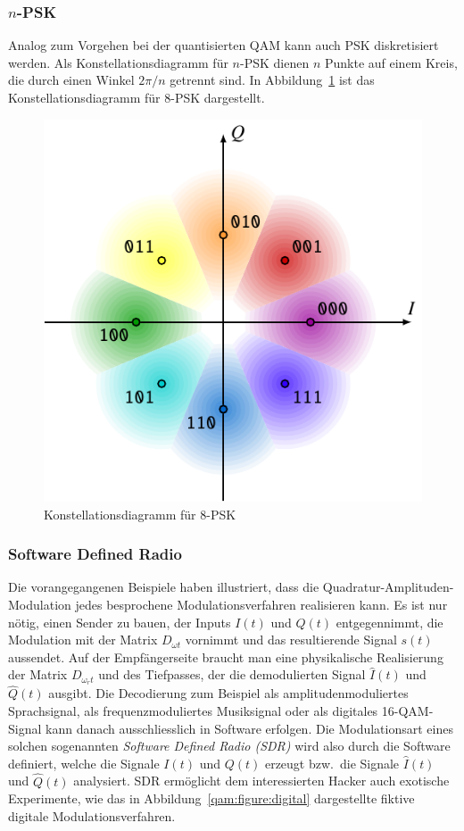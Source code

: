 \subsubsection{$n$-PSK}
Analog zum Vorgehen bei der quantisierten QAM kann auch PSK diskretisiert
werden.
Als Konstellationsdiagramm für $n$-PSK dienen $n$ Punkte auf einem Kreis,
die durch einen Winkel $2\pi/n$ getrennt sind.
In Abbildung~\ref{figure:qam:psk} ist das Konstellationsdiagramm für
$8$-PSK dargestellt.
\begin{figure}
\centering
\includegraphics{applications/qam/images/psk.pdf}
\caption{Konstellationsdiagramm für 8-PSK 
\label{figure:qam:psk}}
\end{figure}

\subsubsection{Software Defined Radio}
Die vorangegangenen Beispiele haben illustriert, dass die
Quadratur-Amplituden-Modulation jedes besprochene Modulationsverfahren
realisieren kann.
Es ist nur nötig, einen Sender zu bauen, der Inputs $I(t)$ und $Q(t)$
entgegennimmt, die Modulation mit der Matrix $D_{\omega t}$ vornimmt
und das resultierende Signal $s(t)$ aussendet.
Auf der Empfängerseite braucht man eine physikalische Realisierung
der Matrix $D_{\omega_r t}$ und des Tiefpasses, der die demodulierten
Signal $\hat{I}(t)$ und $\hat{Q}(t)$ ausgibt.
Die Decodierung zum Beispiel als amplitudenmoduliertes Sprachsignal,
als frequenzmoduliertes Musiksignal oder als digitales 16-QAM-Signal
kann danach ausschliesslich in Software erfolgen.
Die Modulationsart eines solchen sogenannten {\em Software Defined Radio (SDR)}
wird also durch die Software definiert, welche die Signale $I(t)$ und $Q(t)$
erzeugt bzw.~die Signale $\hat{I}(t)$ und $\hat{Q}(t)$ analysiert.
SDR ermöglicht dem interessierten Hacker auch exotische Experimente,
wie das in Abbildung~\ref{qam:figure:digital} dargestellte fiktive
digitale Modulationsverfahren.

